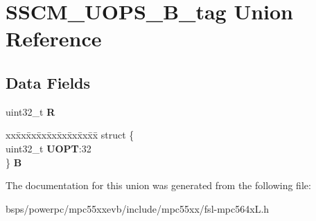 \hypertarget{unionSSCM__UOPS__32B__tag}{}\section{S\+S\+C\+M\+\_\+\+U\+O\+P\+S\+\_\+B\+\_\+tag Union Reference}
\label{unionSSCM__UOPS__32B__tag}
\subsection*{Data Fields}
\begin{DoxyCompactItemize}
\item 
\mbox{\label{unionSSCM__UOPS__32B__tag_a6958dcd649276d3ec72048b7552ddccb}} 
uint32\+\_\+t {\bfseries R}
\item 
\mbox{\label{unionSSCM__UOPS__32B__tag_a81f4894f6cdb14434450d8a781767c35}} 
\begin{tabbing}
xx\=xx\=xx\=xx\=xx\=xx\=xx\=xx\=xx\=\kill
struct \{\\
\>uint32\_t {\bfseries UOPT}:32\\
\} {\bfseries B}\\

\end{tabbing}\end{DoxyCompactItemize}


The documentation for this union was generated from the following file\+:\begin{DoxyCompactItemize}
\item 
bsps/powerpc/mpc55xxevb/include/mpc55xx/fsl-\/mpc564x\+L.\+h\end{DoxyCompactItemize}
